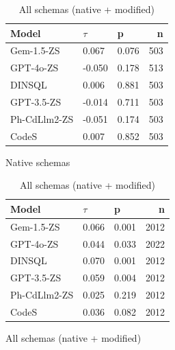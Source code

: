 \begin{table}
  \centering
  \caption{Kendall-Tau ($\tau$) Correlations between \emph{Low Identifier Proportion} and \emph{Execution Accuracy}.}
  \begin{subfigure}{.5\linewidth}
      \centering
      \caption{Native schemas}
      \begin{tabular}{lllr}
\toprule
Model & $\tau$ & p & n \\
\midrule
Gem-1.5-ZS & 0.067 & 0.076 & 503 \\
GPT-4o-ZS & -0.050 & 0.178 & 513 \\
DINSQL & 0.006 & 0.881 & 503 \\
GPT-3.5-ZS & -0.014 & 0.711 & 503 \\
Ph-CdLlm2-ZS & -0.051 & 0.174 & 503 \\
CodeS & 0.007 & 0.852 & 503 \\
\bottomrule
\end{tabular}

      \label{table:natmedium-manual-match-ktau-native}
  \end{subfigure}%
  \begin{subfigure}{.5\linewidth}
      \centering
      \caption{All schemas (native + modified)}
      \begin{tabular}{lllr}
\toprule
Model & $\tau$ & p & n \\
\midrule
Gem-1.5-ZS & 0.066 & 0.001 & 2012 \\
GPT-4o-ZS & 0.044 & 0.033 & 2022 \\
DINSQL & 0.070 & 0.001 & 2012 \\
GPT-3.5-ZS & 0.059 & 0.004 & 2012 \\
Ph-CdLlm2-ZS & 0.025 & 0.219 & 2012 \\
CodeS & 0.036 & 0.082 & 2012 \\
\bottomrule
\end{tabular}

      \label{table:natmedium-manual-match-ktau-all}
  \end{subfigure}
\end{table}

